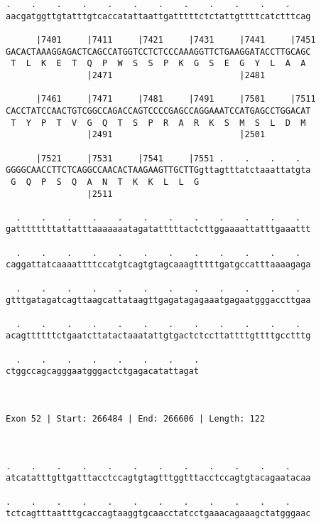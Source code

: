 \documentclass{article}
\begin{document}
\begin{Verbatim}
.    .    .    .    .    .    .    .    .    .    .    .    
aacgatggttgtatttgtcaccatattaattgatttttctctattgttttcatctttcag
                                                            
      |7401     |7411     |7421     |7431     |7441     |7451
GACACTAAAGGAGACTCAGCCATGGTCCTCTCCCAAAGGTTCTGAAGGATACCTTGCAGC
 T  L  K  E  T  Q  P  W  S  S  P  K  G  S  E  G  Y  L  A  A 
                |2471                         |2481         
  
      |7461     |7471     |7481     |7491     |7501     |7511
CACCTATCCAACTGTCGGCCAGACCAGTCCCCGAGCCAGGAAATCCATGAGCCTGGACAT
 T  Y  P  T  V  G  Q  T  S  P  R  A  R  K  S  M  S  L  D  M 
                |2491                         |2501         
  
      |7521     |7531     |7541     |7551 .    .    .    .  
GGGGCAACCTTCTCAGGCCAACACTAAGAAGTTGCTTGgttagtttatctaaattatgta
 G  Q  P  S  Q  A  N  T  K  K  L  L  G                      
                |2511                                       
  
  .    .    .    .    .    .    .    .    .    .    .    .  
gattttttttattatttaaaaaaatagatatttttactcttggaaaattatttgaaattt
                                                            
  .    .    .    .    .    .    .    .    .    .    .    .  
caggattatcaaaattttccatgtcagtgtagcaaagtttttgatgccatttaaaagaga
                                                            
  .    .    .    .    .    .    .    .    .    .    .    .  
gtttgatagatcagttaagcattataagttgagatagagaaatgagaatgggaccttgaa
                                                            
  .    .    .    .    .    .    .    .    .    .    .    .  
acagttttttctgaatcttatactaaatattgtgactctccttattttgttttgcctttg
                                                            
  .    .    .    .    .    .    .    .
ctggccagcagggaatgggactctgagacatattagat
                                      
                                      
 
Exon 52 | Start: 266484 | End: 266606 | Length: 122



.    .    .    .    .    .    .    .    .    .    .    .    
atcatatttgttgatttacctccagtgtagtttggtttacctccagtgtacagaatacaa
                                                            
.    .    .    .    .    .    .    .    .    .    .    .    
tctcagtttaatttgcaccagtaaggtgcaacctatcctgaaacagaaagctatgggaac
                                                            

\end{Verbatim}
\end{document}
